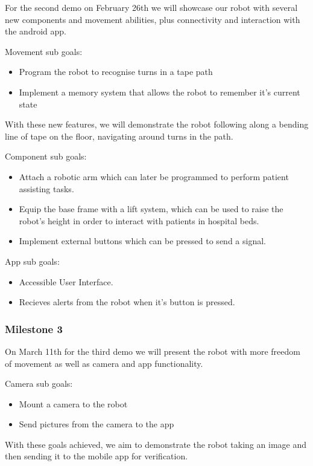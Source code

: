\documentclass{article}
\begin{document}
For the second demo on February 26th we will showcase our robot with several new components and movement abilities, plus connectivity and interaction with the android app.  

Movement sub goals:
\begin{itemize}
\item Program the robot to recognise turns in a tape path
\item Implement a memory system that allows the robot to remember it's current state 
\end{itemize}

With these new features, we will demonstrate the robot following along a bending line of tape on the floor, navigating around turns in the path.

Component sub goals:
\begin{itemize}
\item Attach a robotic arm which can later be programmed to perform patient assisting tasks.
\item Equip the base frame with a lift system, which can be used to raise the robot's height in order to interact with patients in hospital beds.
\item Implement external buttons which can be pressed to send a signal.
\end{itemize}

App sub goals:
\begin{itemize}
\item Accessible User Interface.
\item Recieves alerts from the robot when it's button is pressed.
\end{itemize}

\subsubsection{Milestone 3}

On March 11th for the third demo we will present the robot with more freedom of movement as well as camera and app functionality.

Camera sub goals:
\begin{itemize}
\item Mount a camera to the robot
\item Send pictures from the camera to the app
\end{itemize}

With these goals achieved, we aim to demonstrate the robot taking an image and then sending it to the mobile app for verification.
\end{document}
